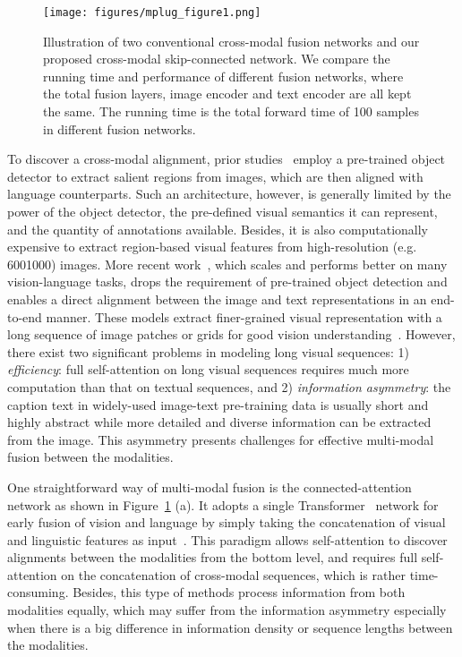 \documentclass[11pt]{article}
\begin{document}
\begin{figure}[t]
     \centering
     \texttt{[image: figures/mplug\_figure1.png]}
     \caption{Illustration of two conventional cross-modal fusion networks and our proposed cross-modal skip-connected network. We compare the running time and performance of different fusion networks, where the total fusion layers, image encoder and text encoder are all kept the same. The running time is the total forward time of 100 samples in different fusion networks.}
     \label{fig:compare}
\end{figure}
To discover a cross-modal alignment, prior studies~\cite{li2020oscar,anderson2018bottom,zhang2021vinvl} employ a pre-trained object detector to extract salient regions from images, which are then aligned with language counterparts. Such an architecture, however, is generally limited by the power of the object detector, the pre-defined visual semantics it can represent, and the quantity of annotations available. Besides, it is also computationally expensive to extract region-based visual features from high-resolution (e.g. 6001000) images. More recent work~\cite{huang2020pixel,wang2021simvlm,li2021align,kim2021vilt,dou2021empirical}, which scales and performs better on many vision-language tasks, drops the requirement of pre-trained object detection and enables a direct alignment between the image and text representations in an end-to-end manner. These models extract finer-grained visual representation with a long sequence of image patches or grids for good vision understanding~\cite{dou2021empirical}. However, there exist two significant problems in modeling long visual sequences: 1) \textit{efficiency}: full self-attention on long visual sequences requires much more computation than that on textual sequences, and 2) \textit{information asymmetry}: the caption text in widely-used image-text pre-training data is usually short and highly abstract while more detailed and diverse information can be extracted from the image. This asymmetry presents challenges for effective multi-modal fusion between the modalities.

One straightforward way of multi-modal fusion is the connected-attention network as shown in Figure~\ref{fig:compare} (a). It adopts a single Transformer~\cite{vaswani2017attention} network for early fusion of vision and language by simply taking the concatenation of visual and linguistic features as input~\cite{li2019visualbert}. This paradigm allows self-attention to discover alignments between the modalities from the bottom level, and requires full self-attention on the concatenation of cross-modal sequences, which is rather time-consuming. Besides, this type of methods process information from both modalities equally, which may suffer from the information asymmetry especially when there is a big difference in information density or sequence lengths between the modalities.
\end{document}
